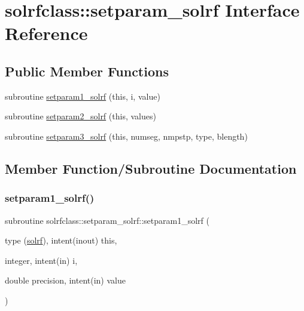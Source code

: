 \hypertarget{interfacesolrfclass_1_1setparam__solrf}{}\section{solrfclass\+::setparam\+\_\+solrf Interface Reference}
\label{interfacesolrfclass_1_1setparam__solrf}
\subsection*{Public Member Functions}
\begin{DoxyCompactItemize}
\item 
subroutine \mbox{\hyperlink{interfacesolrfclass_1_1setparam__solrf_ac8f28ff27564d80d5ed43ece2858e518}{setparam1\+\_\+solrf}} (this, i, value)
\item 
subroutine \mbox{\hyperlink{interfacesolrfclass_1_1setparam__solrf_ac4d08aea115d7001f0c7f48ddaf5fa96}{setparam2\+\_\+solrf}} (this, values)
\item 
subroutine \mbox{\hyperlink{interfacesolrfclass_1_1setparam__solrf_aeab1a4f531a4a46b458217a3395f1198}{setparam3\+\_\+solrf}} (this, numseg, nmpstp, type, blength)
\end{DoxyCompactItemize}


\subsection{Member Function/\+Subroutine Documentation}
\mbox{\label{interfacesolrfclass_1_1setparam__solrf_ac8f28ff27564d80d5ed43ece2858e518}} 
\subsubsection{\texorpdfstring{setparam1\_solrf()}{setparam1\_solrf()}}
{\footnotesize\ttfamily subroutine solrfclass\+::setparam\+\_\+solrf\+::setparam1\+\_\+solrf (\begin{DoxyParamCaption}\item[{type (\mbox{\hyperlink{namespacesolrfclass_structsolrfclass_1_1solrf}{solrf}}), intent(inout)}]{this,  }\item[{integer, intent(in)}]{i,  }\item[{double precision, intent(in)}]{value }\end{DoxyParamCaption})}

